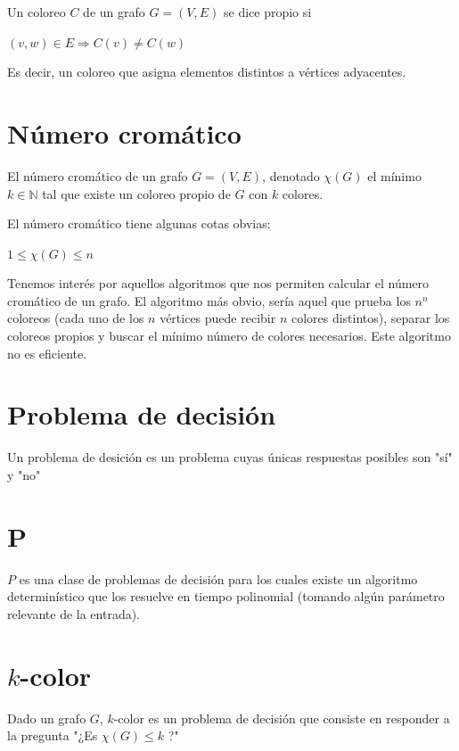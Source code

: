 \documentclass[10pt,a4paper]{article}
\begin{document}
Un coloreo $C$ de un grafo $G=(V, E)$ se dice propio si

\begin{center}
$(v, w) \in E \Rightarrow C(v) \neq C(w)$
\end{center}

Es decir, un coloreo que asigna elementos distintos a vértices adyacentes.

\section*{Número cromático}

El número cromático de un grafo $G = (V, E)$, denotado $\chi(G)$ el mínimo $k \in \mathbb{N}$ tal que existe un coloreo propio de $G$ con $k$ colores.

El número cromático tiene algunas cotas obvias:

\begin{center}
$1 \leq \chi(G)\leq n$
\end{center}

Tenemos interés por aquellos algoritmos que nos permiten calcular el número cromático de un grafo. El algoritmo más obvio, sería aquel que prueba los $n^n$ coloreos (cada uno de los $n$ vértices puede recibir $n$ colores distintos), separar los coloreos propios y buscar el mínimo número de colores necesarios. Este algoritmo no es eficiente.

\section*{Problema de decisión}

Un problema de desición es un problema cuyas únicas respuestas posibles son "sí" y "no"

\section*{P}

$P$ es una clase de problemas de decisión para los cuales existe un algoritmo determinístico que los resuelve en tiempo polinomial (tomando algún parámetro relevante de la entrada).

\section*{$k$-color}

Dado un grafo $G$, $k$-color es un problema de decisión que consiste en responder a la pregunta "¿Es $\chi(G) \leq k$ ?"
\end{document}
